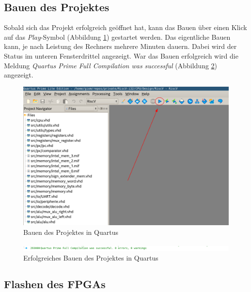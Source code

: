     \subsection{Bauen des Projektes}
        Sobald sich das Projekt erfolgreich geöffnet hat, kann das Bauen über einen Klick
        auf das \textit{Play}-Symbol (Abbildung \ref{fig:quartus_play}) gestartet werden. Das eigentliche Bauen kann, je nach
        Leistung des Rechners mehrere Minuten dauern. Dabei wird der Status im unteren
        Fensterdrittel angezeigt. War das Bauen erfolgreich wird die Meldung
        \textit{Quartus Prime Full Compilation was successful} (Abbildung \ref{fig:quartus_build_sucessful})
        angezeigt.

        \begin{figure}[H]
            \centering
            \includegraphics[scale=0.6]{img/quartus_build.png}
            \caption{Bauen des Projektes in Quartus}
            \label{fig:quartus_play}
        \end{figure}

        \begin{figure}[H]
            \centering
            \includegraphics[scale=0.6]{img/quartus_build_sucessfull.png}
            \caption{Erfolgreiches Bauen des Projektes in Quartus}
            \label{fig:quartus_build_sucessful}
        \end{figure}


    \subsection{Flashen des FPGAs}

